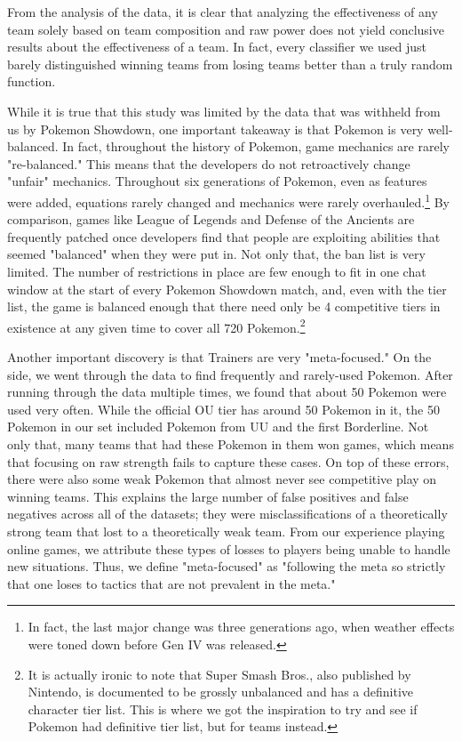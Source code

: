 \documentclass{acm_proc_article-sp}
\begin{document}
From the analysis of the data, it is clear that analyzing the effectiveness of any team solely based on team composition and raw power does not yield conclusive results about the effectiveness of a team. In fact, every classifier we used just barely distinguished winning teams from losing teams better than a truly random function.

While it is true that this study was limited by the data that was withheld from us by Pokemon Showdown, one important takeaway is that Pokemon is very well-balanced. In fact, throughout the history of Pokemon, game mechanics are rarely "re-balanced." This means that the developers do not retroactively change "unfair" mechanics. Throughout six generations of Pokemon, even as features were added, equations rarely changed and mechanics were rarely overhauled.\footnote{In fact, the last major change was three generations ago, when weather effects were toned down before Gen IV was released.} By comparison, games like League of Legends and Defense of the Ancients are frequently patched once developers find that people are exploiting abilities that seemed "balanced" when they were put in. Not only that, the ban list is very limited. The number of restrictions in place are few enough to fit in one chat window at the start of every Pokemon Showdown match, and, even with the tier list, the game is balanced enough that there need only be 4 competitive tiers in existence at any given time to cover all 720 Pokemon.\footnote{It is actually ironic to note that Super Smash Bros., also published by Nintendo, is documented to be grossly unbalanced and has a definitive character tier list. This is where we got the inspiration to try and see if Pokemon had definitive tier list, but for teams instead.}

Another important discovery is that Trainers are very "meta-focused." On the side, we went through the data to find frequently and rarely-used Pokemon. After running through the data multiple times, we found that about 50 Pokemon were used very often. While the official OU tier has around 50 Pokemon in it, the 50 Pokemon in our set included Pokemon from UU and the first Borderline. Not only that, many teams that had these Pokemon in them won games, which means that focusing on raw strength fails to capture these cases. On top of these errors, there were also some weak Pokemon that almost never see competitive play on winning teams. This explains the large number of false positives and false negatives across all of the datasets; they were misclassifications of a theoretically strong team that lost to a theoretically weak team. From our experience playing online games, we attribute these types of losses to players being unable to handle new situations. Thus, we define "meta-focused" as "following the meta so strictly that one loses to tactics that are not prevalent in the meta."
\end{document}
